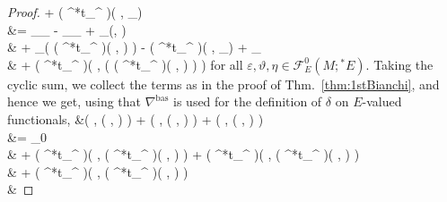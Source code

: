 \begin{proof}
	+ \bigl( {}^*t_{\nabla^{}} \bigr)\mleft( \eta, \delta_\vartheta \varepsilon \mright)
\\
&=
\delta_\eta \delta_\vartheta \varepsilon
	- \delta_\eta \delta_\varepsilon \vartheta
	+ \delta_{\Delta(\vartheta, \varepsilon)} \eta
\\
&\hspace{1cm}
	+ \delta_\eta \mleft( \bigl( {}^*t_{\nabla^{}} \bigr)\mleft( \vartheta, \varepsilon \mright) \mright)
	- \bigl( {}^*t_{\nabla^{}} \bigr)\mleft( \eta, \delta_\varepsilon \vartheta \mright)
	+ _{}
\\
&\hspace{1cm}
	+ \bigl( {}^*t_{\nabla^{}} \bigr)\mleft( \eta, \mleft( \bigl( {}^*t_{\nabla^{}} \bigr)\mleft( \vartheta, \varepsilon \mright) \mright) \mright)
\eas
for all $\varepsilon, \vartheta, \eta \in \mathcal{F}_E^0(M; {}^*E)$. Taking the cyclic sum, we collect the terms as in the proof of Thm.~\ref{thm:1stBianchi}, and hence we get, using that $\nabla^{\mathrm{bas}}$ is used for the definition of $\delta$ on $E$-valued functionals,
\bas
&\Delta\mleft( \eta, \Delta\mleft( \vartheta, \varepsilon \mright) \mright)
	+ \Delta\mleft( \vartheta, \Delta\mleft( \varepsilon, \eta \mright) \mright)
	+ \Delta\mleft( \varepsilon, \Delta\mleft( \eta, \vartheta \mright) \mright)
\\
&=
_{0}
\\
&\hspace{1cm}
	+ \bigl( {}^*t_{\nabla^{}} \bigr)\mleft( \eta, \bigl( {}^*t_{\nabla^{}} \bigr)\mleft( \vartheta, \varepsilon \mright) \mright) 
	+ \bigl( {}^*t_{\nabla^{}} \bigr)\mleft( \varepsilon, \bigl( {}^*t_{\nabla^{}} \bigr)\mleft( \eta, \vartheta \mright) \mright) 
\\
&\hspace{1cm}
	+ \bigl( {}^*t_{\nabla^{}} \bigr)\mleft( \vartheta, \bigl( {}^*t_{\nabla^{}} \bigr)\mleft( \varepsilon, \eta \mright) \mright) 
\\
&\hspace{1cm}

\end{proof}
